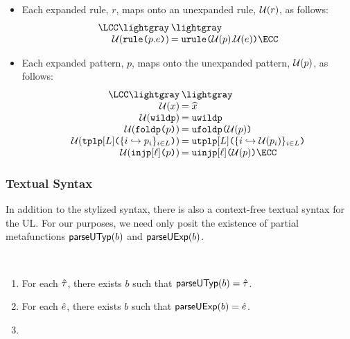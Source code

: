 \begin{grayparbox}
\begin{itemize}
\item Each expanded rule, $r$, maps onto an unexpanded rule, $\mathcal{U}(r)$, as follows:
\[\arraycolsep=1pt\begin{array}{rl}
\LCC \lightgray & \lightgray \\
\Uof{\aematchrule{p}{e}} & = \aumatchrule{\Uof{p}}{\Uof{e}}\ECC
\end{array}\]
\item Each expanded pattern, $p$, maps onto the unexpanded pattern, $\mathcal{U}(p)$, as follows:
\[\arraycolsep=1pt\begin{array}{rl}
\LCC \lightgray & \lightgray \\
\Uof{x} & = \sigilof{x}\\
\Uof{\aewildp} &= \auwildp\\
\Uof{\aefoldp{p}} &= \aufoldp{\Uof{p}}\\
\Uof{\aetplp{\labelset}{\mapschema{p}{i}{\labelset}}} & = \autplp{\labelset}{\mapschemax{\Uofv}{p}{i}{\labelset}}\\
\Uof{\aeinjp{\ell}{p}} & = \auinjp{\ell}{\Uof{p}}\ECC
\end{array}\]
\end{itemize}
\end{grayparbox}
\vspace{-10px}
\subsubsection{Textual Syntax}\vspace{-3px} In addition to the stylized syntax, there is also a context-free textual syntax for the UL. For our purposes, we need only posit the existence of partial metafunctions $\mathsf{parseUTyp}(b)$ and $\mathsf{parseUExp}(b)$. 

\begin{condition}\label{condition:textual-representability-SES} ~
\begin{enumerate}
\item For each ${\hat\tau}$, there exists $b$ such that $\mathsf{parseUTyp}(b)={\hat\tau}$. 
\item For each ${\hat e}$, there exists $b$ such that $\mathsf{parseUExp}(b)={\hat e}$.
\item {}
\end{enumerate}
\end{condition}

